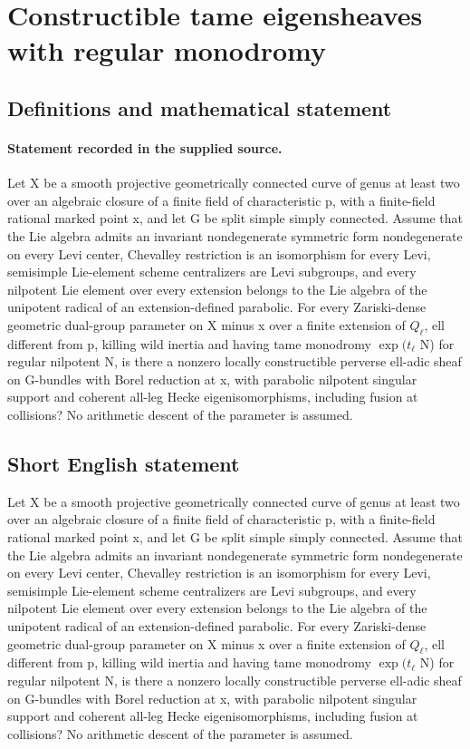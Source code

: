 \documentclass[11pt]{article}
\begin{document}
\section*{Constructible tame eigensheaves with regular monodromy}\label{30007281}
\subsection{Definitions and mathematical statement}
\paragraph{Statement recorded in the supplied source.}
Let X be a smooth projective geometrically connected curve of genus at least two over an algebraic closure of a finite field of characteristic p, with a finite-field rational marked point x, and let G be split simple simply connected. Assume that the Lie algebra admits an invariant nondegenerate symmetric form nondegenerate on every Levi center, Chevalley restriction is an isomorphism for every Levi, semisimple Lie-element scheme centralizers are Levi subgroups, and every nilpotent Lie element over every extension belongs to the Lie algebra of the unipotent radical of an extension-defined parabolic. For every Zariski-dense geometric dual-group parameter on X minus x over a finite extension of $Q_\ell $, ell different from p, killing wild inertia and having tame monodromy $\exp (t_\ell $ N) for regular nilpotent N, is there a nonzero locally constructible perverse ell-adic sheaf on G-bundles with Borel reduction at x, with parabolic nilpotent singular support and coherent all-leg Hecke eigenisomorphisms, including fusion at collisions? No arithmetic descent of the parameter is assumed.
\subsection{Short English statement}
Let X be a smooth projective geometrically connected curve of genus at least two over an algebraic closure of a finite field of characteristic p, with a finite-field rational marked point x, and let G be split simple simply connected. Assume that the Lie algebra admits an invariant nondegenerate symmetric form nondegenerate on every Levi center, Chevalley restriction is an isomorphism for every Levi, semisimple Lie-element scheme centralizers are Levi subgroups, and every nilpotent Lie element over every extension belongs to the Lie algebra of the unipotent radical of an extension-defined parabolic. For every Zariski-dense geometric dual-group parameter on X minus x over a finite extension of $Q_\ell $, ell different from p, killing wild inertia and having tame monodromy $\exp (t_\ell $ N) for regular nilpotent N, is there a nonzero locally constructible perverse ell-adic sheaf on G-bundles with Borel reduction at x, with parabolic nilpotent singular support and coherent all-leg Hecke eigenisomorphisms, including fusion at collisions? No arithmetic descent of the parameter is assumed.
\end{document}
